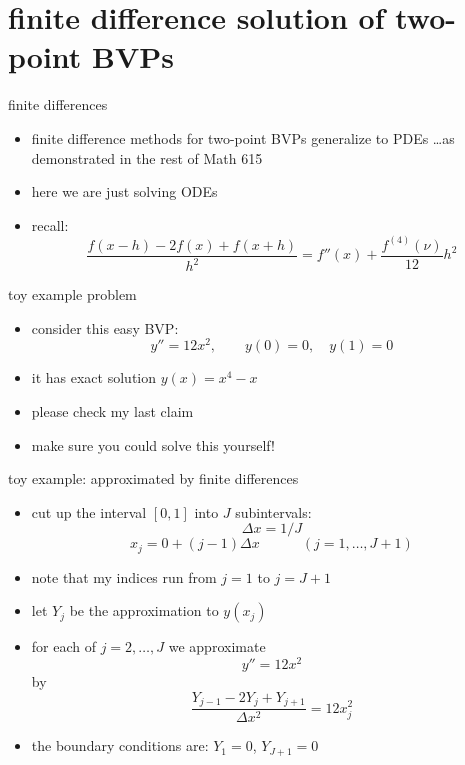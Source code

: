 \documentclass[10pt,hyperref]{beamer}
\begin{document}
\section[finite difference]{finite difference solution of two-point BVPs}

\begin{frame}{finite differences} 

\begin{itemize}
\item finite difference methods for two-point BVPs generalize to PDEs \dots as demonstrated in the rest of Math 615
\item here we are just solving ODEs
\bigskip\bigskip

\item recall:
	$$\frac{f(x-h) - 2 f(x) + f(x+h)}{h^2} = f''(x) + \frac{f^{(4)}(\nu)}{12} h^2$$
\end{itemize}
\end{frame}


\begin{frame}{toy example problem} 

\begin{itemize}
\item consider this easy BVP:
    $$y'' = 12 x^2, \qquad y(0)=0, \quad y(1) = 0$$
\item it has exact solution $y(x)=x^4-x$
\item \alert{please check my last claim}
\item \alert{make sure you could solve this yourself!}
\end{itemize}
\end{frame}


\begin{frame}{toy example: approximated by finite differences} 

\begin{itemize}
\item cut up the interval $[0,1]$ into $J$ subintervals:
	$$\Delta x = 1/J$$
	$$x_j = 0 + (j-1) \Delta x \qquad\quad(j=1,\dots,J+1)$$
\item note that my indices run from $j=1$ to $j=J+1$
\item let $Y_j$ be the approximation to $y(x_j)$
\item for each of $j=2,\dots,J$ we approximate
    $$y'' = 12 x^2$$
by
	$$\frac{Y_{j-1} - 2 Y_j + Y_{j+1}}{\Delta x^2} = 12 x_j^2$$
\item the boundary conditions are: $Y_1 = 0$, $Y_{J+1} = 0$
\end{itemize}
\end{frame}
\end{document}
